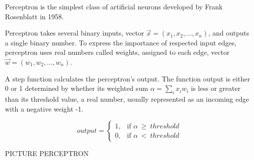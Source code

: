 Perceptron is the simplest class of artificial neurons developed by Frank Rosenblatt in 1958.\cite{perceptronprobabmodel}

Perceptron takes several binary inputs, vector $\vec{x} = (x_1, x_2,...,x_n)$, and outputs a single binary number. To express the importance of respected input edges, perceptron uses real numbers called weights, assigned to each edge, vector $\vec{w} = (w_1,w_2,...,w_n)$.

A step function calculates the perceptron's output.
The function output is either 0 or 1 determined by whether its weighted sum $\alpha = \sum_{i} x_i w_i$ is less or greater than its threshold value, a real number, usually represented as an incoming edge with a negative weight -1.

\begin{equation}
    output =
\begin{cases}
    1, & \text{if $\alpha\ \geq\ threshold$}\\
    0, & \text{if $\alpha\ <\ threshold$}
\end{cases} 
\end{equation} 


PICTURE PERCEPTRON